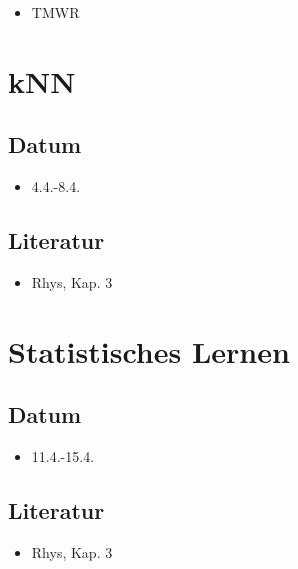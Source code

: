 \documentclass[
]{book}
\providecommand{\tightlist}{%
  \setlength{\itemsep}{0pt}\setlength{\parskip}{0pt}}
\begin{document}
\begin{itemize}
\tightlist
\item
  TMWR
\end{itemize}

\hypertarget{knn}{%
\section{kNN}\label{knn}}

\hypertarget{datum-3}{%
\subsection{Datum}\label{datum-3}}

\begin{itemize}
\tightlist
\item
  4.4.-8.4.
\end{itemize}

\hypertarget{literatur-4}{%
\subsection{Literatur}\label{literatur-4}}

\begin{itemize}
\tightlist
\item
  Rhys, Kap. 3
\end{itemize}

\hypertarget{statistisches-lernen}{%
\section{Statistisches Lernen}\label{statistisches-lernen}}

\hypertarget{datum-4}{%
\subsection{Datum}\label{datum-4}}

\begin{itemize}
\tightlist
\item
  11.4.-15.4.
\end{itemize}

\hypertarget{literatur-5}{%
\subsection{Literatur}\label{literatur-5}}

\begin{itemize}
\tightlist
\item
  Rhys, Kap. 3
\end{itemize}
\end{document}
